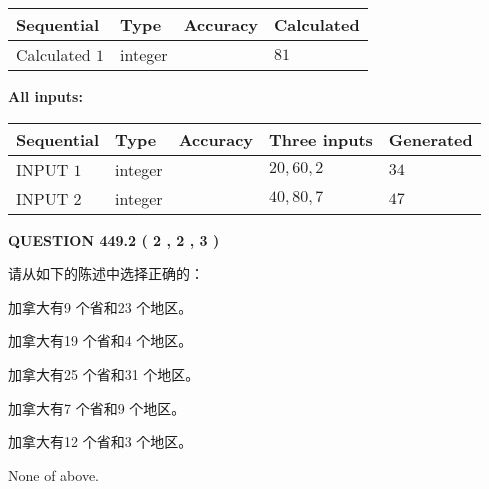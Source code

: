 \documentclass{ctexart}
\begin{document}
   
   
   
\noindent{}
   
   
  
  
\noindent\begin{tabular}{|l|l|l|l|}
\hline
 Sequential & Type & Accuracy & Calculated \\ 
\hline
 
 
  Calculated $  1 $ & integer &  & 
  $ 81 $ 
 \\  \hline  
 \end{tabular}
   
   
   
   
\noindent\vspace{0.1in}\hspace{-0.08in} {\textbf{\Large{All inputs: }}}
   
   
  
  
\noindent\begin{tabular}{|l|l|l|l|l|}
\hline
 Sequential & Type & Accuracy & Three inputs & Generated \\ 
\hline
 
 
  INPUT $  1 $ & integer &  & $
 20
 , 
 60
 , 
 2
 $ & $ 34 $ 
 \\  \hline  
 
 
  INPUT $  2 $ & integer &  & $
 40
 , 
 80
 , 
 7
 $ & $ 47 $ 
 \\  \hline  
 \end{tabular}
   
   
  
\vspace{0.2in}
  
{\textbf{\Large{QUESTION
449.2 
 ( 2 , 2 , 3 )
}}}
  
  
请从如下的陈述中选择正确的：
 
 
加拿大有9 个省和23 个地区。
 
 
加拿大有19 个省和4 个地区。
 
 
加拿大有25 个省和31 个地区。
 
 
加拿大有7 个省和9 个地区。
 
 
加拿大有12 个省和3 个地区。
 
 
 None of above.
 
 
\noindent{}
 
\end{document}

